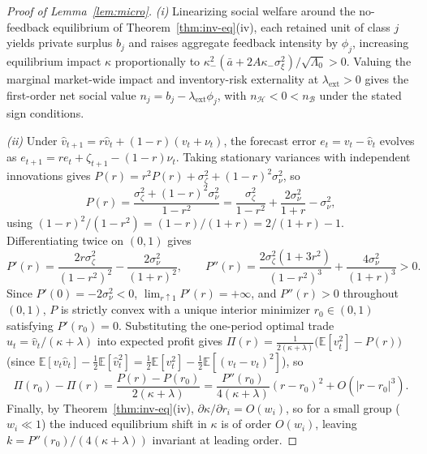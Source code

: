 \documentclass[11pt,letterpaper]{article}
\theoremstyle{definition}
\newcommand{\E}{\mathbb{E}}
\begin{document}
\begin{proof}[Proof of Lemma~\ref{lem:micro}]
\emph{(i)} Linearizing social welfare around the no-feedback equilibrium of Theorem~\ref{thm:inv-eq}(iv), each retained unit of class $j$ yields private surplus $b_j$ and raises aggregate feedback intensity by $\phi_j$, increasing equilibrium impact $\kappa$ proportionally to $\kappa_-^2(\bar{a} + 2A\kappa_-\sigma_\xi^2)/\sqrt{\Lambda_0} > 0$. Valuing the marginal market-wide impact and inventory-risk externality at $\lambda_{\mathrm{ext}} > 0$ gives the first-order net social value $n_j = b_j - \lambda_{\mathrm{ext}}\phi_j$, with $n_{\mathcal{H}} < 0 < n_{\mathcal{B}}$ under the stated sign conditions.

\emph{(ii)} Under $\hat{v}_{t+1} = r \hat{v}_t + (1 - r)(v_t + \nu_t)$, the forecast error $e_t = v_t - \hat{v}_t$ evolves as $e_{t+1} = r e_t + \zeta_{t+1} - (1 - r)\nu_t$. Taking stationary variances with independent innovations gives $P(r) = r^2 P(r) + \sigma_\zeta^2 + (1 - r)^2 \sigma_\nu^2$, so
\[
  P(r) = \frac{\sigma_\zeta^2 + (1 - r)^2 \sigma_\nu^2}{1 - r^2}
       = \frac{\sigma_\zeta^2}{1 - r^2} + \frac{2\sigma_\nu^2}{1 + r} - \sigma_\nu^2,
\]
using $(1 - r)^2 / (1 - r^2) = (1 - r)/(1 + r) = 2/(1 + r) - 1$. Differentiating twice on $(0, 1)$ gives
\[
  P'(r) = \frac{2 r \sigma_\zeta^2}{(1 - r^2)^2} - \frac{2\sigma_\nu^2}{(1 + r)^2},
  \qquad
  P''(r) = \frac{2\sigma_\zeta^2(1 + 3r^2)}{(1 - r^2)^3} + \frac{4\sigma_\nu^2}{(1 + r)^3} > 0.
\]
Since $P'(0) = -2\sigma_\nu^2 < 0$, $\lim_{r \uparrow 1} P'(r) = +\infty$, and $P''(r) > 0$ throughout $(0, 1)$, $P$ is strictly convex with a unique interior minimizer $r_0 \in (0, 1)$ satisfying $P'(r_0) = 0$. Substituting the one-period optimal trade $u_t = \hat{v}_t / (\kappa + \lambda)$ into expected profit gives $\Pi(r) = \frac{1}{2(\kappa + \lambda)}\bigl(\E[v_t^2] - P(r)\bigr)$ (since $\E[v_t \hat{v}_t] - \frac{1}{2}\E[\hat{v}_t^2] = \frac{1}{2}\E[v_t^2] - \frac{1}{2}\E[(v_t - \hat{v}_t)^2]$), so
\[
  \Pi(r_0) - \Pi(r) = \frac{P(r) - P(r_0)}{2(\kappa + \lambda)}
  = \frac{P''(r_0)}{4(\kappa + \lambda)}(r - r_0)^2 + O\!\left(|r - r_0|^3\right).
\]
Finally, by Theorem~\ref{thm:inv-eq}(iv), $\partial \kappa / \partial r_i = O(w_i)$, so for a small group ($w_i \ll 1$) the induced equilibrium shift in $\kappa$ is of order $O(w_i)$, leaving $k = P''(r_0)/(4(\kappa + \lambda))$ invariant at leading order.
\end{proof}
\end{document}
